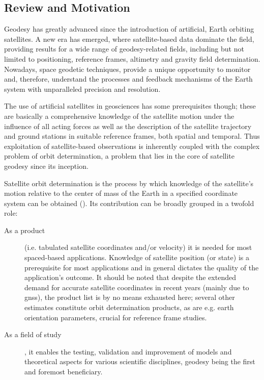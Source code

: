 \subsection{Review and Motivation}\label{ssec:review-and-motvation}

Geodesy has greatly advanced since the introduction of artificial, Earth orbiting 
satellites. A new era has emerged, where satellite-based data dominate the field, 
providing results for a wide range of geodesy-related fields, including but not 
limited to positioning, reference frames, altimetry and gravity field determination. 
Nowadays, space geodetic techniques, provide a unique opportunity to monitor and, 
therefore, understand the processes and feedback mechanisms of the Earth 
system with unparalleled precision and resolution.
\iffalse (\cite{Jin2013}). \fi

The use of artificial satellites in geosciences has some prerequisites though; 
these are basically a comprehensive knowledge of the satellite motion under 
the influence of all acting forces as well as the description of the satellite
trajectory and ground stations in suitable reference frames, both spatial and 
temporal. Thus exploitation of satellite-based observations is inherently 
coupled with the complex problem of orbit determination, a problem that lies in 
the core of satellite geodesy since its inception.

Satellite orbit determination is the process by which knowledge of the satellite’s
motion relative to the center of mass of the Earth in a specified coordinate 
system can be obtained (\cite{Tapley2004}). Its contribution can be broadly
grouped in a twofold role:
\begin{description}
    \item[As a product] (i.e. tabulated satellite coordinates and/or velocity) 
    it is needed for most spaced-based applications. Knowledge of satellite 
    position (or state) is a prerequisite for most applications and in general 
    dictates the quality of the application's outcome. It should be noted that 
    despite the extended demand for accurate satellite coordinates in recent 
    years (mainly due to \gls{gnss}), the product list is by no means exhausted here; 
    several other estimates constitute orbit determination products, as are e.g. 
    earth orientation parameters, crucial for reference frame studies.
    \item[As a field of study], it enables the testing, validation and improvement 
    of models and theoretical aspects for various scientific disciplines, 
    geodesy being the first and foremost beneficiary.
\end{description}

